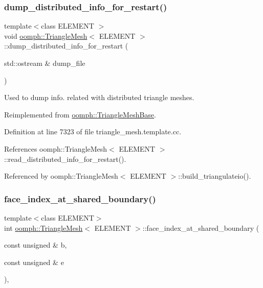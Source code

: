 \subsubsection{\texorpdfstring{dump\+\_\+distributed\+\_\+info\+\_\+for\+\_\+restart()}{dump\_distributed\_info\_for\_restart()}}
{\footnotesize\ttfamily template$<$class E\+L\+E\+M\+E\+NT $>$ \\
void \hyperlink{classoomph_1_1TriangleMesh}{oomph\+::\+Triangle\+Mesh}$<$ E\+L\+E\+M\+E\+NT $>$\+::dump\+\_\+distributed\+\_\+info\+\_\+for\+\_\+restart (\begin{DoxyParamCaption}\item[{std\+::ostream \&}]{dump\+\_\+file }\end{DoxyParamCaption})\hspace{0.3cm}{\ttfamily [virtual]}}



Used to dump info. related with distributed triangle meshes. 



Reimplemented from \hyperlink{classoomph_1_1TriangleMeshBase_ad8e275d5f2528d9958964438086be8f4}{oomph\+::\+Triangle\+Mesh\+Base}.



Definition at line 7323 of file triangle\+\_\+mesh.\+template.\+cc.



References oomph\+::\+Triangle\+Mesh$<$ E\+L\+E\+M\+E\+N\+T $>$\+::read\+\_\+distributed\+\_\+info\+\_\+for\+\_\+restart().



Referenced by oomph\+::\+Triangle\+Mesh$<$ E\+L\+E\+M\+E\+N\+T $>$\+::build\+\_\+triangulateio().

\mbox{\label{classoomph_1_1TriangleMesh_add131164ffb57a4569147c03231acb8e}} 
\subsubsection{\texorpdfstring{face\+\_\+index\+\_\+at\+\_\+shared\+\_\+boundary()}{face\_index\_at\_shared\_boundary()}}
{\footnotesize\ttfamily template$<$class E\+L\+E\+M\+E\+NT$>$ \\
int \hyperlink{classoomph_1_1TriangleMesh}{oomph\+::\+Triangle\+Mesh}$<$ E\+L\+E\+M\+E\+NT $>$\+::face\+\_\+index\+\_\+at\+\_\+shared\+\_\+boundary (\begin{DoxyParamCaption}\item[{const unsigned \&}]{b,  }\item[{const unsigned \&}]{e }\end{DoxyParamCaption})\hspace{0.3cm}{\ttfamily [inline]}, {\ttfamily [protected]}}




